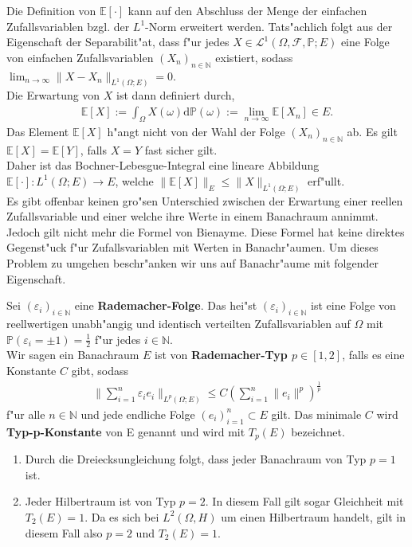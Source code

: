 Die Definition von $\mathbb{E}[\cdot]$ kann auf den Abschluss der Menge der einfachen Zufallsvariablen bzgl. der $L^1$-Norm erweitert werden. Tats"achlich folgt aus der Eigenschaft der Separabilit"at, dass f"ur jedes $X\in\mathcal{L}^1(\Omega,\mathcal{F},\mathbb{P};E)$ eine Folge von einfachen Zufallsvariablen $(X_n)_{n\in\mathbb{N}}$ existiert, sodass $\lim_{n\rightarrow \infty}\|X-X_n\|_{L^1(\Omega;E)}=0$.\\
Die Erwartung von $X$ ist dann definiert durch,
\begin{align*}
\mathbb{E}[X]:=\int_\Omega X(\omega)\text{d}\mathbb{P}(\omega):=\lim_{n\rightarrow \infty} \mathbb{E}[X_n]\in E.
\end{align*}
Das Element $\mathbb{E}[X]$ h"angt nicht von der Wahl der Folge $(X_n)_{n\in\mathbb{N}}$ ab. Es gilt $\mathbb{E}[X]=\mathbb{E}[Y]$, falls $X=Y$ fast sicher gilt. \\
Daher ist das Bochner-Lebesgue-Integral eine lineare Abbildung $\mathbb{E}[\cdot]:L^1(\Omega;E)\rightarrow E$, welche $\|\mathbb{E}[X]\|_E\leq \|X\|_{L^1(\Omega;E)}$ erf"ullt.\\
Es gibt offenbar keinen gro"sen Unterschied zwischen der Erwartung einer reellen Zufallsvariable und einer welche ihre Werte in einem Banachraum annimmt. Jedoch gilt nicht mehr die Formel von Bienayme. Diese Formel hat keine direktes Gegenst"uck f"ur Zufallsvariablen mit Werten in Banachr"aumen. Um dieses Problem zu umgehen beschr"anken wir uns auf Banachr"aume mit folgender Eigenschaft.
\begin{df}
Sei $(\varepsilon_i)_{i\in\mathbb{N}}$ eine \textbf{Rademacher-Folge}. 
Das hei"st $(\varepsilon_i)_{i\in\mathbb{N}}$ ist eine Folge von reellwertigen unabh"angig und identisch verteilten Zufallsvariablen auf $\Omega$ mit $\mathbb{P}(\varepsilon_i=\pm 1)=\frac{1}{2}$ f"ur jedes $i\in\mathbb{N}$.\\
Wir sagen ein Banachraum $E$ ist von \textbf{Rademacher-Typ $p\in [1,2]$}, falls es eine Konstante $C$ gibt, sodass 
\begin{align*}
\Big\|\sum_{i=1}^n \varepsilon_i e_i \Big\|_{L^p(\Omega;E)}\leq C \left(\sum_{i=1}^n\|e_i\|^p\right)^{\frac{1}{p}}
\end{align*}
f"ur alle $n\in\mathbb{N}$ und jede endliche Folge $(e_i)_{i=1}^n\subset E$ gilt. Das minimale $C$ wird \textbf{Typ-p-Konstante} von E genannt und wird mit $T_p(E)$ bezeichnet.
\end{df}
\begin{bsp}
\begin{enumerate}
\item[a)]Durch die Dreiecksungleichung folgt, dass jeder Banachraum von Typ $p=1$ ist.
\item[b)]Jeder Hilbertraum ist von Typ $p=2$. In diesem Fall gilt sogar Gleichheit mit $T_2(E)=1$.
Da es sich bei  $L^2(\Omega,H)$ um einen Hilbertraum handelt, gilt in diesem Fall also $p=2$ und $T_2(E)=1$.
\end{enumerate}
\end{bsp}

